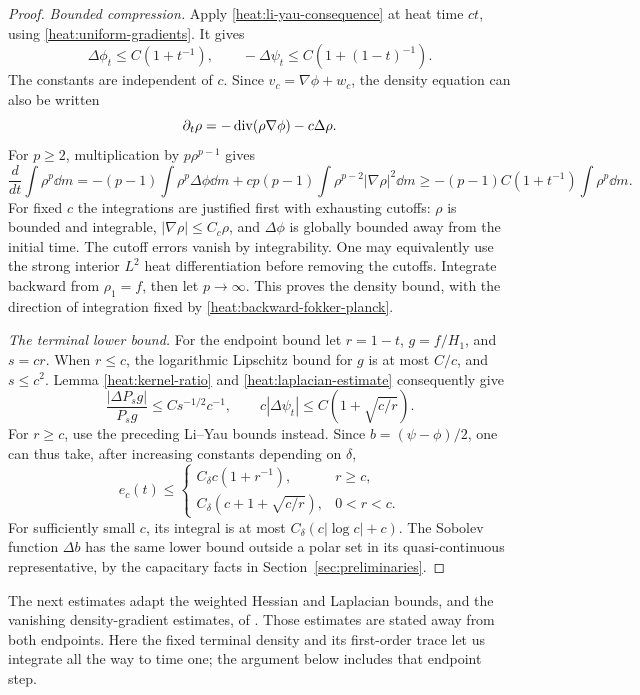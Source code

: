 \begin{proof}
\emph{Bounded compression.}
Apply \eqref{heat:li-yau-consequence} at heat time \(ct\),
using \eqref{heat:uniform-gradients}. It gives
\[
\Delta\phi_t\le C(1+t^{-1}),\qquad
-\Delta\psi_t\le C(1+(1-t)^{-1}).
\]
The constants are independent of \(c\). Since
\(v_c=\nabla\phi+w_c\), the density equation can also be written
\begin{equation}
\label{heat:backward-fokker-planck}
\partial_t\rho=-\operatorname{div}(\rho\nabla\phi)-c\Delta\rho.
\end{equation}
For \(p\ge2\), multiplication by \(p\rho^{p-1}\) gives
\[
\frac{d}{dt}\int\rho^p\dd m
=-(p-1)\int\rho^p\Delta\phi\dd m
+cp(p-1)\int\rho^{p-2}|\nabla\rho|^2\dd m
\ge-(p-1)C(1+t^{-1})\int\rho^p\dd m.
\]
For fixed \(c\) the integrations are justified first with
exhausting cutoffs: \(\rho\) is bounded and integrable,
\(|\nabla\rho|\le C_c\rho\), and \(\Delta\phi\) is globally
bounded away from the initial time. The cutoff errors vanish
by integrability. One may equivalently use the strong interior
\(L^2\) heat differentiation before removing the cutoffs.
Integrate backward from \(\rho_1=f\), then let \(p\to\infty\).
This proves the density bound, with the direction of integration
fixed by \eqref{heat:backward-fokker-planck}.

\emph{The terminal lower bound.}
For the endpoint bound let \(r=1-t\), \(g=f/H_1\), and
\(s=cr\). When \(r\le c\), the logarithmic Lipschitz bound for
\(g\) is at most \(C/c\), and \(s\le c^2\). Lemma
\ref{heat:kernel-ratio} and
\eqref{heat:laplacian-estimate} consequently give
\[
\frac{|\Delta P_sg|}{P_sg}
\le C s^{-1/2}c^{-1},\qquad
c|\Delta\psi_t|
\le C\left(1+\sqrt{c/r}\right).
\]
For \(r\ge c\), use the preceding Li--Yau bounds instead.
Since \(b=(\psi-\phi)/2\), one can thus take, after increasing
constants depending on \(\delta\),
\[
e_c(t)\le
\begin{cases}
C_\delta c(1+r^{-1}),&r\ge c,\\
C_\delta(c+1+\sqrt{c/r}),&0<r<c.
\end{cases}
\]
For sufficiently small \(c\), its integral is at most
\(C_\delta(c|\log c|+c)\). The Sobolev function \(\Delta b\)
has the same lower bound outside a polar set in its
quasi-continuous representative, by the capacitary facts in
Section~\ref{sec:preliminaries}.
\end{proof}

The next estimates adapt the weighted Hessian and Laplacian bounds,
and the vanishing density-gradient estimates, of
\cite[Lemmas~4.9--4.10]{GigliTamanini2021}. Those estimates are stated
away from both endpoints. Here the fixed terminal density and its
first-order trace let us integrate all the way to time one; the
argument below includes that endpoint step.

